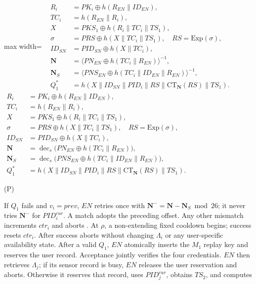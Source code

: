 \documentclass[cmc,article,submit,moreauthors,pdftex]{Definitions/tsp}
\renewcommand{\mathsf}[1]{\mathrm{#1}}
\newcommand{\cc}{\mathbin{\|}}
\newcommand{\CT}{\mathsf{CT}}
\newcounter{protoeq} %
\newenvironment{ceq}{%
  \refstepcounter{protoeq}%
  \par\vspace{-3pt}\setlength{\topsep}{0pt}\setlength{\partopsep}{0pt}\begin{center}%
}{%
  \hspace{0.45em}\textup{(P\theprotoeq)}%
  \end{center}\vspace{-3pt}%
} %
\providecommand{\DIFadd}[1]{{\protect\color{blue} \sf #1}} %
\providecommand{\DIFdel}[1]{{\protect\color{red} \scriptsize #1}} %
\providecommand{\DIFaddbegin}{} %
\providecommand{\DIFaddend}{} %
\providecommand{\DIFdelbegin}{} %
\providecommand{\DIFdelend}{} %
\begin{document}
\DIFdelbegin %
\DIFdelend \DIFaddbegin \begin{ceq}
\DIFaddend \begin{adjustbox}{max width=\linewidth}
\DIFdelbegin \DIFdel{%
\mbox{%
$\displaystyle\begin{aligned}
R_i &= PK_i \oplus h(R_{EN} \cc ID_{EN}),\\
TC_i &= h(R_{EN} \cc R_i),\\
X &= PKS_1 \oplus h(R_i \cc TC_i \cc TS_1),\\
\sigma &= PRS \oplus h(X \cc TC_i \cc TS_1),\quad RS=\mathsf{Exp}(\sigma),\\
ID_{SN} &= PID_{SN} \oplus h(X \cc TC_i),\\
\mathbf{N} &= \langle PN_{EN} \oplus h(TC_i \cc R_{EN})\rangle^{-1},\\
\mathbf{N}_S &= \langle PNS_{EN} \oplus h(TC_i \cc ID_{EN} \cc R_{EN})\rangle^{-1},\\
Q_1^{*} &= h(X \cc ID_{SN} \cc PID_i \cc RS \cc \CT_{\mathbf{N}}(RS) \cc TS_1).
\end{aligned}$
}%
}\DIFdelend \DIFaddbegin \DIFadd{%
\mbox{%
$\displaystyle\begin{aligned}
R_i &= PK_i \oplus h(R_{EN} \cc ID_{EN}),\\
TC_i &= h(R_{EN} \cc R_i),\\
X &= PKS_1 \oplus h(R_i \cc TC_i \cc TS_1),\\
\sigma &= PRS \oplus h(X \cc TC_i \cc TS_1),\quad RS=\mathsf{Exp}(\sigma),\\
ID_{SN} &= PID_{SN} \oplus h(X \cc TC_i),\\
\mathbf{N} &= \operatorname{dec}_s\bigl(PN_{EN} \oplus h(TC_i \cc R_{EN})\bigr),\\
\mathbf{N}_S &= \operatorname{dec}_s\bigl(PNS_{EN} \oplus h(TC_i \cc ID_{EN} \cc R_{EN})\bigr),\\
Q_1^{*} &= h(X \cc ID_{SN} \cc PID_i \cc RS \cc \CT_{\mathbf{N}}(RS) \cc TS_1).
\end{aligned}$
}%
}\DIFaddend \end{adjustbox}
\DIFdelbegin %
\DIFdelend \DIFaddbegin \end{ceq}
\DIFaddend 

If $Q_1$ fails and $v_i=prev$, $EN$ retries once with $\mathbf{N}^{-}=\mathbf{N}-\mathbf{N}_S\bmod26$; it never tries $\mathbf{N}^{-}$ for $PID_i^{cur}$. A match adopts the preceding offset. Any other mismatch \DIFdelbegin \DIFdel{increments $ctr_i$ and aborts . At $\rho$, a non-extending fixed cooldown begins; success resets $ctr_i$. After success}\DIFdelend \DIFaddbegin \DIFadd{aborts without changing $\Lambda_i$ or any user-specific availability state. After a valid $Q_1$}\DIFaddend , $EN$ atomically inserts the $M_1$ replay key and reserves the user record. Acceptance jointly verifies the four credentials. $EN$ then retrieves $\Lambda_j$; if its sensor record is busy, $EN$ releases the user reservation and aborts. Otherwise it reserves that record, uses $PID_j^{cur}$, obtains $TS_2$, and computes
\end{document}
